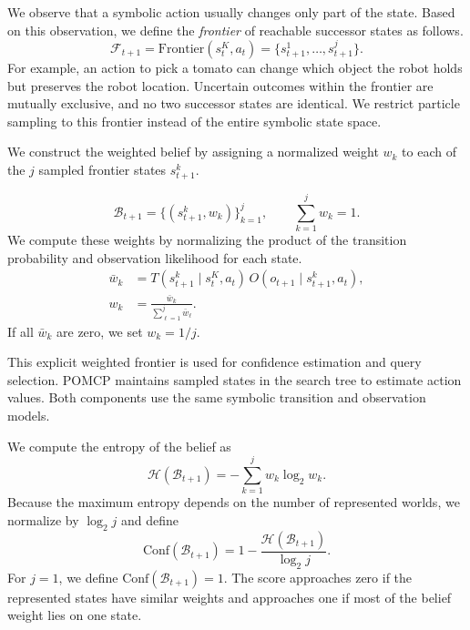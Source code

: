 We observe that a symbolic action usually changes only part of the state. Based on this observation, we define the \textit{frontier} of reachable successor states as follows.
\begin{equation}
\mathcal{F}_{t+1}
=
\mathrm{Frontier}(s_t^{K},a_t)
=
\{s_{t+1}^{1},\ldots,s_{t+1}^{j}\}.
\label{eq:frontier}
\end{equation}
For example, an action to pick a tomato can change which object the robot holds but preserves the robot location. Uncertain outcomes within the frontier are mutually exclusive, and no two successor states are identical. We restrict particle sampling to this frontier instead of the entire symbolic state space.

We construct the weighted belief by assigning a normalized weight $w_k$ to each of the $j$ sampled frontier states $s_{t+1}^{k}$.

\begin{equation}
\mathcal{B}_{t+1}
=
\{(s_{t+1}^{k},w_k)\}_{k=1}^{j},
\qquad
\sum_{k=1}^{j}w_k=1.
\label{eq:symbolic_belief}
\end{equation}
We compute these weights by normalizing the product of the transition probability and observation likelihood for each state. 
\begin{equation}
\begin{aligned}
\bar{w}_{k}
&=T(s_{t+1}^{k}\mid s_t^{K},a_t)\,
O(o_{t+1}\mid s_{t+1}^{k},a_t),\\
w_k&=\frac{\bar{w}_k}{\sum_{\ell=1}^{j}\bar{w}_{\ell}}.
\end{aligned}
\label{eq:belief_update}
\end{equation}
If all $\bar{w}_k$ are zero, we set $w_k=1/j$.

This explicit weighted frontier is used for confidence estimation and query selection. POMCP maintains sampled states in the search tree to estimate action values. Both components use the same symbolic transition and observation models. 

We compute the entropy of the belief as
\[
\mathcal{H}(\mathcal{B}_{t+1})
=
-\sum_{k=1}^{j}w_k\log_2 w_k.
\]
Because the maximum entropy depends on the number of represented worlds, we normalize by $\log_2 j$ and define
\begin{equation}
\mathrm{Conf}(\mathcal{B}_{t+1})
=
1-\frac{\mathcal{H}(\mathcal{B}_{t+1})}{\log_2 j}.
\label{eq:compute_confidence}
\end{equation}
For $j=1$, we define $\mathrm{Conf}(\mathcal{B}_{t+1})=1$. The score approaches zero if the represented states have similar weights and approaches one if most of the belief weight lies on one state.

